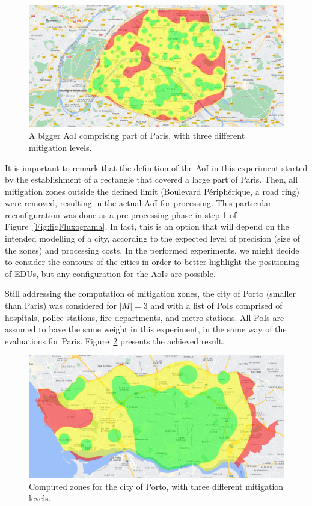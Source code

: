 \begin{refsection}
\begin{figure}[ht!]
  \centering
  \includegraphics[width=0.9\linewidth]{Chapters/2-EDUs/images/paris_M3.png}
  \caption{A bigger AoI comprising part of Paris, with three different mitigation levels.}\label{Fig:zones_paris_3}
\end{figure}

It is important to remark that the definition of the AoI in this experiment started by the establishment of a rectangle that covered a large part of Paris. Then, all mitigation zones outside the defined limit (Boulevard Périphérique, a road ring) were removed, resulting in the actual AoI for processing. This particular reconfiguration was done as a pre-processing phase in step 1 of Figure~\ref{Fig:figFluxograma}. In fact, this is an option that will depend on the intended modelling of a city, according to the expected level of precision (size of the zones) and processing costs. In the performed experiments, we might decide to consider the contours of the cities in order to better highlight the positioning of EDUs, but any configuration for the AoIs are possible.

Still addressing the computation of mitigation zones, the city of Porto (smaller than Paris) was considered for $|M|=3$ and with a list of PoIs comprised of hospitals, police stations, fire departments, and metro stations. All PoIs are assumed to have the same weight in this experiment, in the same way of the evaluations for Paris. Figure~\ref{Fig:zones_porto_3} presents the achieved result. 

\begin{figure}[ht!]
  \centering
  \includegraphics[width=0.9\linewidth]{Chapters/2-EDUs/images/porto_M3_no_weight.png}
  \caption{Computed zones for the city of Porto, with three different mitigation levels.}\label{Fig:zones_porto_3}
\end{figure}


\end{refsection}
